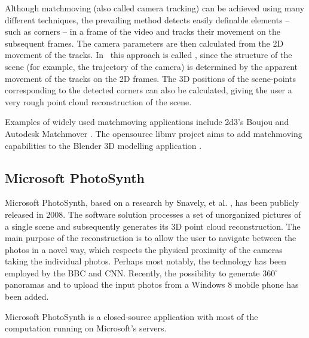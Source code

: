 Although matchmoving (also called camera tracking) can be achieved using many different techniques, the prevailing method detects easily definable elements -- such as corners -- in a frame of the video and tracks their movement on the subsequent frames. 
The camera parameters are then calculated from the 2D movement of the tracks. 
In \cv\, this approach is called , since the structure of the scene (for example, the trajectory of the camera) is determined by the apparent movement of the tracks on the 2D frames.  
The 3D positions of the scene-points corresponding to the detected corners can also be calculated, giving the user a very rough point cloud reconstruction of the scene.

Examples of widely used matchmoving applications include 2d3's Boujou  and Autodesk Matchmover .
The opensource libmv project  aims to add matchmoving capabilities to the Blender 3D modelling application .

\subsection{Microsoft PhotoSynth} 

Microsoft PhotoSynth, based on a research by Snavely, et al. , has been publicly released in 2008. 
The software solution processes a set of unorganized pictures of a single scene and subsequently generates its 3D point cloud reconstruction. 
The main purpose of the reconstruction is to allow the user to navigate between the photos in a novel way, which respects the physical proximity of the cameras taking the individual photos. 
Perhaps most notably, the technology has been employed by the BBC and CNN. %
Recently, the possibility to generate $360^\circ$ panoramas and to upload the input photos from a Windows 8 mobile phone has been added. 

Microsoft PhotoSynth is a closed-source application with most of the computation running on Microsoft's servers. 
 



